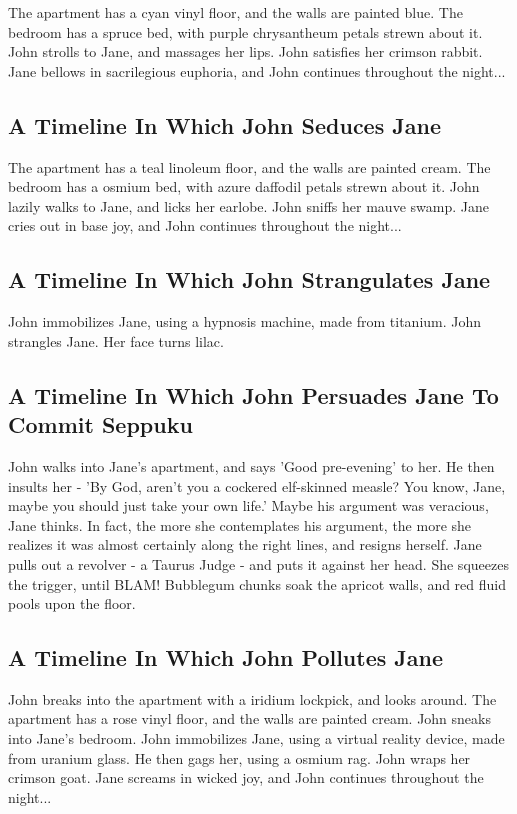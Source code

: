\documentclass{article}
\begin{document}
The apartment has a cyan vinyl floor, and the walls are painted blue.
The bedroom has a spruce bed, with purple chrysantheum petals strewn about it.
John strolls to Jane, and massages her lips.
John satisfies her crimson rabbit.
Jane bellows in sacrilegious euphoria, and John continues throughout the night...
\subsection{A Timeline In Which John Seduces Jane}


The apartment has a teal linoleum floor, and the walls are painted cream.
The bedroom has a osmium bed, with azure daffodil petals strewn about it.
John lazily walks to Jane, and licks her earlobe.
John sniffs her mauve swamp.
Jane cries out in base joy, and John continues throughout the night...
\subsection{A Timeline In Which John Strangulates Jane}


John immobilizes Jane, using a hypnosis machine, made from titanium.
John strangles Jane.
Her face turns lilac.
\subsection{A Timeline In Which John Persuades Jane To Commit Seppuku}


John walks into Jane's apartment, and says 'Good pre{-}evening' to her.
He then insults her {-} 'By God, aren't you a cockered elf{-}skinned measle?
You know, Jane, maybe you should just take your own life.'
Maybe his argument was veracious, Jane thinks.
In fact, the more she contemplates his argument, the more she realizes it was almost certainly along the right lines, and resigns herself.
Jane pulls out a revolver {-} a Taurus Judge {-} and puts it against her head.
She squeezes the trigger, until BLAM!
Bubblegum chunks soak the apricot walls, and red fluid pools upon the floor.
\subsection{A Timeline In Which John Pollutes Jane}


John breaks into the apartment with a iridium lockpick, and looks around.
The apartment has a rose vinyl floor, and the walls are painted cream.
John sneaks into Jane's bedroom.
John immobilizes Jane, using a virtual reality device, made from uranium glass.
He then gags her, using a osmium rag.
John wraps her crimson goat.
Jane screams in wicked joy, and John continues throughout the night...
\end{document}
